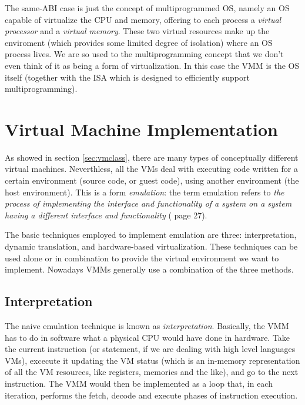 \vspace{0.5cm}

The same-ABI case is just the concept of multiprogrammed OS, namely an OS capable of virtualize the CPU and
memory, offering to each process a \emph{virtual processor} and a \emph{virtual memory}. These two virtual resources make up
the enviroment (which provides some limited degree of isolation) where an OS process lives. We are so used to the multiprogramming
concept that we don't even think of it as being a form of virtualization. In this case the VMM is the OS itself (together with
the ISA which is designed to efficiently support multiprogramming).


\section{Virtual Machine Implementation}
\label{sec:vmimpl}

As showed in section \ref{sec:vmclass}, there are many types of conceptually different virtual machines.
Neverthless, all the VMs deal with executing code written for a certain environment (source code, or guest code),
using another environment (the host environment). This is a form \emph{emulation}: the term emulation refers to \emph{the process of
implementing the interface and functionality of a system on a system having a different interface and functionality}
(\cite{ref:vmbook} page 27).

The basic techniques employed to implement emulation are three: interpretation, dynamic translation, and hardware-based virtualization.
These techniques can be used alone or in combination to provide the virtual environment we want to implement.
Nowadays VMMs generally use a combination of the three methods.


\subsection{Interpretation}
The naive emulation technique is known as \emph{interpretation}.
Basically, the VMM has to do in software what a physical CPU would have done
in hardware. Take the current instruction (or statement, if we are dealing with high level languages VMs), excecute it updating the
VM status (which is an in-memory representation of all the VM resources, like registers, memories and the like), and go to the next
instruction. The VMM would then be implemented as a loop that, in each iteration, performs the fetch, decode and execute phases of
instruction execution.

